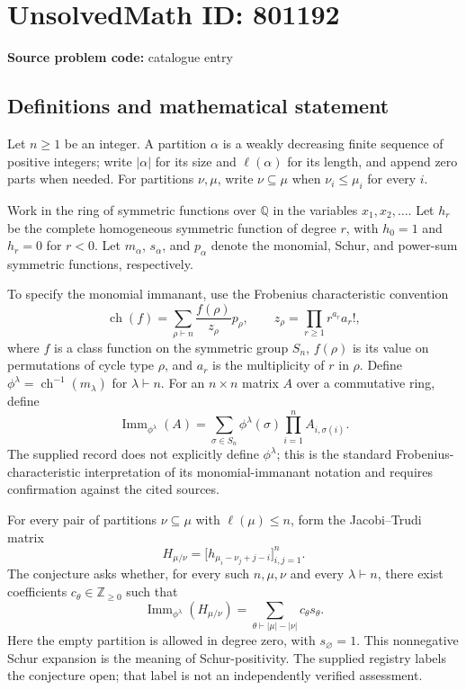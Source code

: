 \documentclass[11pt]{article}
\newcommand{\Z}{\mathbb{Z}}
\newcommand{\Q}{\mathbb{Q}}
\begin{document}
\section*{UnsolvedMath ID: 801192}
\textbf{Source problem code:} catalogue entry
\subsection{Definitions and mathematical statement}
Let \(n\geq 1\) be an integer. A partition \(\alpha\) is a weakly decreasing finite sequence of positive integers; write \(|\alpha|\) for its size and \(\ell(\alpha)\) for its length, and append zero parts when needed. For partitions \(\nu,\mu\), write \(\nu\subseteq\mu\) when \(\nu_i\leq\mu_i\) for every \(i\).

Work in the ring of symmetric functions over \(\Q\) in the variables \(x_1,x_2,\ldots\). Let \(h_r\) be the complete homogeneous symmetric function of degree \(r\), with \(h_0=1\) and \(h_r=0\) for \(r<0\). Let \(m_\alpha\), \(s_\alpha\), and \(p_\alpha\) denote the monomial, Schur, and power-sum symmetric functions, respectively.

To specify the monomial immanant, use the Frobenius characteristic convention
\[
\operatorname{ch}(f)=\sum_{\rho\vdash n}\frac{f(\rho)}{z_\rho}p_\rho,
\qquad
z_\rho=\prod_{r\geq1}r^{a_r}a_r!,
\]
where \(f\) is a class function on the symmetric group \(S_n\), \(f(\rho)\) is its value on permutations of cycle type \(\rho\), and \(a_r\) is the multiplicity of \(r\) in \(\rho\). Define \(\phi^\lambda=\operatorname{ch}^{-1}(m_\lambda)\) for \(\lambda\vdash n\). For an \(n\times n\) matrix \(A\) over a commutative ring, define
\[
\operatorname{Imm}_{\phi^\lambda}(A)
=\sum_{\sigma\in S_n}\phi^\lambda(\sigma)
\prod_{i=1}^{n}A_{i,\sigma(i)}.
\]
The supplied record does not explicitly define \(\phi^\lambda\); this is the standard Frobenius-characteristic interpretation of its monomial-immanant notation and requires confirmation against the cited sources.

For every pair of partitions \(\nu\subseteq\mu\) with \(\ell(\mu)\leq n\), form the Jacobi--Trudi matrix
\[
H_{\mu/\nu}=\bigl[h_{\mu_i-\nu_j+j-i}\bigr]_{i,j=1}^{n}.
\]
The conjecture asks whether, for every such \(n,\mu,\nu\) and every \(\lambda\vdash n\), there exist coefficients \(c_\theta\in\Z_{\geq0}\) such that
\[
\operatorname{Imm}_{\phi^\lambda}(H_{\mu/\nu})
=\sum_{\theta\vdash |\mu|-|\nu|}c_\theta s_\theta.
\]
Here the empty partition is allowed in degree zero, with \(s_{\varnothing}=1\). This nonnegative Schur expansion is the meaning of Schur-positivity. The supplied registry labels the conjecture open; that label is not an independently verified assessment.
\end{document}
